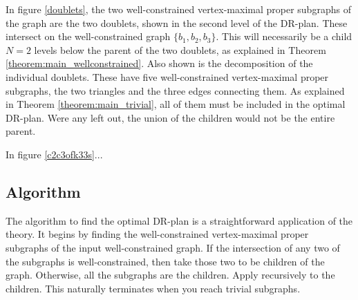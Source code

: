 \begin{example}
    In figure \ref{doublets}, the two well-constrained vertex-maximal proper subgraphs of the graph are the two doublets, shown in the second level of the DR-plan. These intersect on the well-constrained graph $\{b_1,b_2,b_3\}$. This will necessarily be a child $N=2$ levels below the parent of the two doublets, as explained in Theorem \ref{theorem:main_wellconstrained}. Also shown is the decomposition of the individual doublets. These have five well-constrained vertex-maximal proper subgraphs, the two triangles and the three edges connecting them. As explained in Theorem \ref{theorem:main_trivial}, all of them must be included in the optimal DR-plan. Were any left out, the union of the children would not be the entire parent.
\end{example}



\begin{figure*}\centering

\caption{A doublet with each edge replaced by a $K3,3$. }
\label{c2c3ofk33s}
\end{figure*}

\begin{example}
    In figure \ref{c2c3ofk33s}... 
\end{example}









\subsection{Algorithm}
The algorithm to find the optimal DR-plan is a straightforward application of the theory. It begins by finding the well-constrained vertex-maximal proper subgraphs of the input well-constrained graph. If the intersection of any two of the subgraphs is well-constrained, then take those two to be children of the graph. Otherwise, all the subgraphs are the children. Apply recursively to the children. This naturally terminates when you reach trivial subgraphs.
